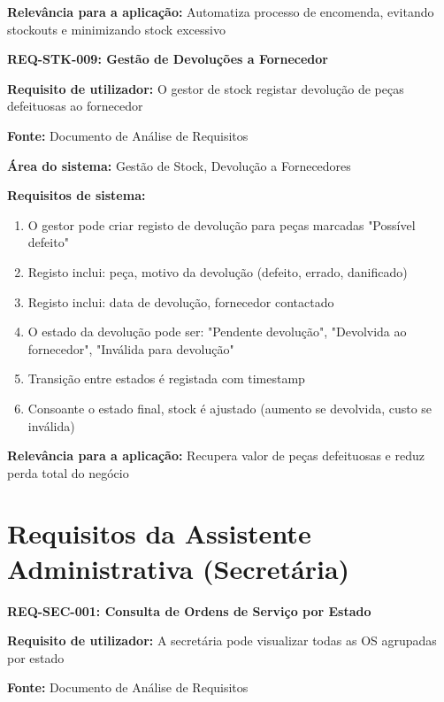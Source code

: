 \documentclass[11pt,a4paper]{article}
\newcommand{\reqheader}[1]{{\noindent\large\bfseries\color{sectionblue}#1}\par\vspace{0.3cm}}
\newcommand{\reqfield}[2]{{\noindent\textbf{#1:} #2}\par\vspace{0.2cm}}
\begin{document}
\reqfield{Relevância para a aplicação}{Automatiza processo de encomenda, evitando stockouts e minimizando stock excessivo}

\vspace{0.8cm}

\reqheader{REQ-STK-009: Gestão de Devoluções a Fornecedor}

\reqfield{Requisito de utilizador}{O gestor de stock registar devolução de peças defeituosas ao fornecedor}

\reqfield{Fonte}{Documento de Análise de Requisitos}

\reqfield{Área do sistema}{Gestão de Stock, Devolução a Fornecedores}

\reqfield{Requisitos de sistema}{
	\begin{enumerate}
		\item O gestor pode criar registo de devolução para peças marcadas "Possível defeito"
		\item Registo inclui: peça, motivo da devolução (defeito, errado, danificado)
		\item Registo inclui: data de devolução, fornecedor contactado
		\item O estado da devolução pode ser: "Pendente devolução", "Devolvida ao fornecedor", "Inválida para devolução"
		\item Transição entre estados é registada com timestamp
		\item Consoante o estado final, stock é ajustado (aumento se devolvida, custo se inválida)
	\end{enumerate}
}

\reqfield{Relevância para a aplicação}{Recupera valor de peças defeituosas e reduz perda total do negócio}

\vspace{1.5cm}


\section*{Requisitos da Assistente Administrativa (Secretária)}

\reqheader{REQ-SEC-001: Consulta de Ordens de Serviço por Estado}

\reqfield{Requisito de utilizador}{A secretária pode visualizar todas as OS agrupadas por estado}

\reqfield{Fonte}{Documento de Análise de Requisitos}
\end{document}
